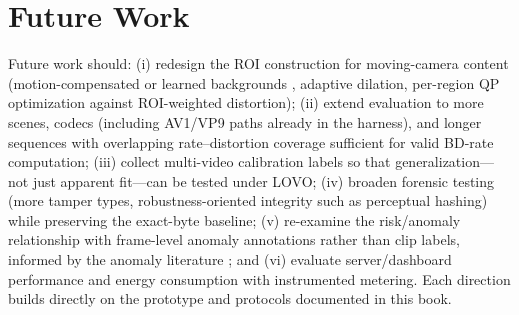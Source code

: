 \section{Future Work}

Future work should: (i) redesign the ROI construction for moving-camera content (motion-compensated or learned backgrounds \cite{Zhao2025ASVC,Wu2024ROIDVC}, adaptive dilation, per-region QP optimization against ROI-weighted distortion); (ii) extend evaluation to more scenes, codecs (including AV1/VP9 paths already in the harness), and longer sequences with overlapping rate--distortion coverage sufficient for valid BD-rate computation; (iii) collect multi-video calibration labels so that generalization---not just apparent fit---can be tested under LOVO; (iv) broaden forensic testing (more tamper types, robustness-oriented integrity such as perceptual hashing) while preserving the exact-byte baseline; (v) re-examine the risk/anomaly relationship with frame-level anomaly annotations rather than clip labels, informed by the anomaly literature \cite{Duong2023Survey,ACMTaxonomy2024,Baradaran2021Anomaly}; and (vi) evaluate server/dashboard performance and energy consumption with instrumented metering. Each direction builds directly on the prototype and protocols documented in this book.
